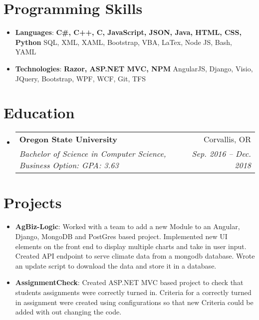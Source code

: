 \documentclass[letterpaper,11pt]{article}
\makeatletter
\newcommand{\resumeItem}[2]{
  \item\small{
    \textbf{#1}{: #2 \vspace{-2pt}}
  }
}
\newcommand{\resumeSubheading}[4]{
  \vspace{-1pt}\item
    \begin{tabular*}{0.97\textwidth}{l@{\extracolsep{\fill}}r}
      \textbf{#1} & #2 \\
      \textit{\small#3} & \textit{\small #4} \\
    \end{tabular*}\vspace{-5pt}
}
\newcommand{\resumeSubItem}[2]{\resumeItem{#1}{#2}\vspace{-4pt}}
\newcommand{\resumeSubHeadingListStart}{\begin{itemize}[leftmargin=*]}
\newcommand{\resumeSubHeadingListEnd}{\end{itemize}}
\makeatother
\begin{document}
\section{Programming Skills}
  \resumeSubHeadingListStart
    \item{
     \textbf{Languages}{: \textbf{C\#, C++, C, JavaScript, JSON, Java, HTML, CSS, Python} SQL, XML, XAML, Bootstrap, VBA, LaTex, Node JS, Bash, YAML}}
     \item{
      \textbf{Technologies}{: \textbf{Razor, ASP.NET MVC, NPM} AngularJS, Django, Visio, JQuery, Bootstrap, WPF, WCF, Git, TFS}
    }
  \resumeSubHeadingListEnd

\section{Education}
  \resumeSubHeadingListStart
    \resumeSubheading
      {Oregon State University}{Corvallis, OR}
      {Bachelor of Science in Computer Science, Business Option:  GPA: 3.63}{Sep. 2016 -- Dec. 2018}
  \resumeSubHeadingListEnd

\section{Projects}
  \resumeSubHeadingListStart
    \resumeSubItem{AgBiz-Logic}
      {Worked with a team to add a new Module to an Angular, Django, MongoDB and PostGres based project. Implemented new UI elements on the front end to display multiple charts and take in user input. Created API endpoint to serve climate data from a mongodb database. Wrote an update script to download the data and store it in a database.}
    \resumeSubItem{AssignmentCheck}
      {Created ASP.NET MVC based project to check that students assignments were correctly turned in. Criteria for a correctly turned in assignment were created using configurations so that new Criteria could be added with out changing the code.}
  \resumeSubHeadingListEnd
\end{document}
